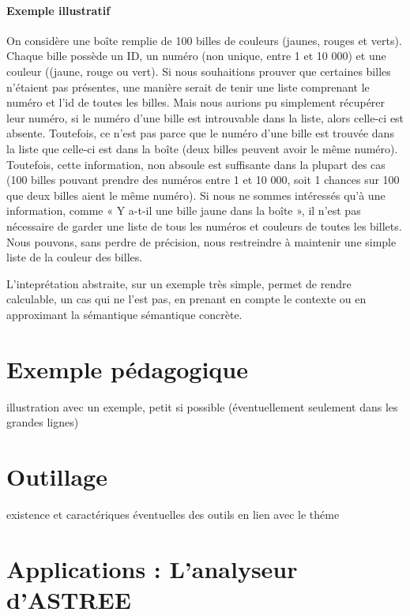 \documentclass[french]{report}
\begin{document}
\paragraph{Exemple illustratif}
On considère une boîte remplie de 100 billes de couleurs (jaunes, rouges et verts).
Chaque bille possède un ID, un numéro (non unique, entre 1 et 10 000)
et une couleur ((jaune, rouge ou vert).
Si nous souhaitions prouver que certaines billes n'étaient pas présentes, une manière serait
de tenir une liste comprenant le numéro et l'id de toutes les billes.
Mais nous aurions pu simplement récupérer leur numéro, si le numéro d'une bille est introuvable dans la liste,
alors celle-ci est absente. Toutefois, ce n'est pas parce que le numéro d'une bille est
trouvée dans la liste que celle-ci est dans la boîte (deux billes peuvent avoir le
même numéro). Toutefois, cette information, non absoule est suffisante dans la plupart
des cas (100 billes pouvant prendre des numéros entre 1 et 10 000, soit 1 chances sur 100 que deux billes aient
le même numéro).
Si nous ne sommes intéressés qu'à une information,
comme « Y a-t-il une bille jaune dans la boîte », il n'est
pas nécessaire de garder une liste de tous les numéros et couleurs de toutes les billets.
Nous pouvons, sans perdre de précision, nous
restreindre à maintenir une simple liste de la couleur des billes.

L'inteprétation abstraite, sur un exemple très simple, permet de rendre calculable, un cas qui ne l'est pas,
en prenant en compte le contexte ou en approximant la sémantique sémantique concrète.



\section{Exemple pédagogique}

illustration avec un exemple, petit si possible  (éventuellement seulement dans les grandes lignes)

\section{Outillage}

existence et caractériques éventuelles des outils en lien avec le théme

\section{Applications : L'analyseur d'ASTREE}
\end{document}
